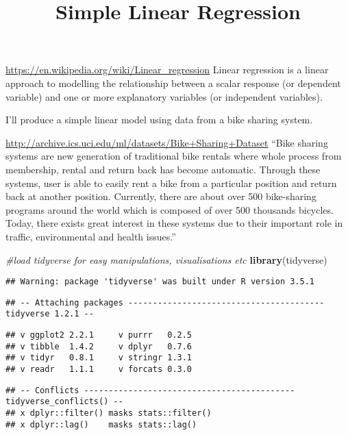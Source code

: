 \documentclass[]{article}
\title{Simple Linear Regression}
\author{}
\date{}
\newenvironment{Shaded}{\begin{snugshade}}{\end{snugshade}}
\newcommand{\KeywordTok}[1]{\textcolor[rgb]{0.13,0.29,0.53}{\textbf{#1}}}
\newcommand{\CommentTok}[1]{\textcolor[rgb]{0.56,0.35,0.01}{\textit{#1}}}
\newcommand{\NormalTok}[1]{#1}
\begin{document}
\maketitle

\url{https://en.wikipedia.org/wiki/Linear_regression} Linear regression
is a linear approach to modelling the relationship between a scalar
response (or dependent variable) and one or more explanatory variables
(or independent variables).

I'll produce a simple linear model using data from a bike sharing
system.

\url{http://archive.ics.uci.edu/ml/datasets/Bike+Sharing+Dataset} ``Bike
sharing systems are new generation of traditional bike rentals where
whole process from membership, rental and return back has become
automatic. Through these systems, user is able to easily rent a bike
from a particular position and return back at another position.
Currently, there are about over 500 bike-sharing programs around the
world which is composed of over 500 thousands bicycles. Today, there
exists great interest in these systems due to their important role in
traffic, environmental and health issues.''

\begin{Shaded}
\begin{Highlighting}[]
\CommentTok{#load tidyverse for easy manipulations, visualisations etc}
\KeywordTok{library}\NormalTok{(tidyverse)}
\end{Highlighting}
\end{Shaded}

\begin{verbatim}
## Warning: package 'tidyverse' was built under R version 3.5.1
\end{verbatim}

\begin{verbatim}
## -- Attaching packages ---------------------------------------- tidyverse 1.2.1 --
\end{verbatim}

\begin{verbatim}
## v ggplot2 2.2.1     v purrr   0.2.5
## v tibble  1.4.2     v dplyr   0.7.6
## v tidyr   0.8.1     v stringr 1.3.1
## v readr   1.1.1     v forcats 0.3.0
\end{verbatim}

\begin{verbatim}
## -- Conflicts ------------------------------------------- tidyverse_conflicts() --
## x dplyr::filter() masks stats::filter()
## x dplyr::lag()    masks stats::lag()
\end{verbatim}
\end{document}
